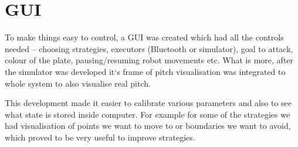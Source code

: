 \section{GUI}

To make things easy to control, a GUI was created which had all the controls needed – choosing strategies, executors (Bluetooth or simulator), goal to attack, colour of the plate, pausing/resuming robot movements etc. What is more, after the simulator was developed it‘s frame of pitch visualisation was integrated to whole system to also visualise real pitch. \linebreak

This development made it easier to calibrate various parameters and also to see what state is stored inside computer. For example for some of the strategies we had visualisation of points we want to move to or boundaries we want to avoid, which proved to be very useful to improve strategies.